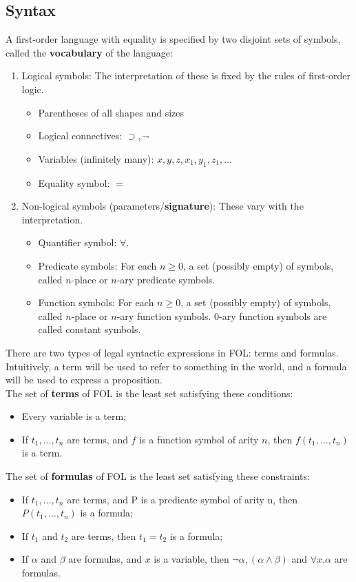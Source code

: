 \documentclass{article}
\begin{document}
\subsection{Syntax}
A first-order language with equality is specified by two disjoint sets of symbols, called the
\mbox{\textbf{vocabulary}} of the language:\\
\begin{enumerate}
 \item Logical symbols: The interpretation of these is fixed by the rules of first-order logic.
\begin{itemize}
 \item Parentheses of all shapes and sizes
 \item Logical connectives: $\supset,\neg$
 \item Variables (infinitely many): $x, y, z, x_1, y_1, z_1, \ldots$
 \item Equality symbol: $=$
\end{itemize}
\item Non-logical symbols (parameters/\textbf{signature}): These vary with the interpretation.
\begin{itemize}
 \item  Quantifier symbol: $\forall$.
 \item Predicate symbols: For each $n \geq 0$, a set (possibly empty) of symbols, called $n$-place or $n$-ary predicate symbols.
 \item Function symbols: For each $n \geq 0$, a set (possibly empty) of symbols, called $n$-place or $n$-ary function symbols. $0$-ary function symbols are called constant symbols.
\end{itemize}
\end{enumerate}
There are two types of legal syntactic expressions in FOL: terms and
formulas. Intuitively, a term will be used to refer to something in the
world, and a formula will be used to express a proposition.\\
The set of \textbf{terms} of FOL is the least set satisfying these conditions:
\begin{itemize}
 \item Every variable is a term;
 \item If $t_1, \ldots , t_n$ are terms, and $f$ is a function symbol of arity $n$,
then $f(t_1, \ldots , t_n)$ is a term.
\end{itemize}
The set of \textbf{formulas} of FOL is the least set satisfying these constraints:
\begin{itemize}
 \item If $t_1, \ldots , t_n$ are terms, and P is a predicate symbol of arity n, then $P(t_1, \ldots , t_n)$ is a formula;
 \item If $t_1$ and $t_2$ are terms, then $t_1 = t_2$ is a formula;
 \item If $\alpha$ and $\beta$ are formulas, and $x$ is a variable, then $\neg\alpha, (\alpha\land\beta)$ and $\forall x.\alpha$ are formulas.
\end{itemize}
\end{document}
